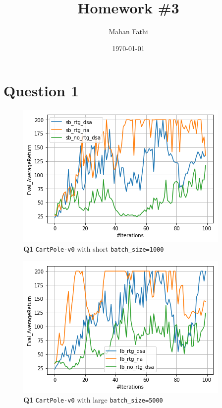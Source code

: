 \documentclass[11pt]{article}
\author{Mahan Fathi}
\date{\today}
\title{\textbf{Homework \#3}}
\begin{document}
\maketitle
\clearpage
\section{Question 1}
\label{sec:orga1d818e}
\begin{figure}[htbp]
\centering
\includegraphics[width=.9\linewidth]{./q11.png}
\caption{\textbf{Q1} \texttt{CartPole-v0} with short \texttt{batch\_size=1000}}
\end{figure}

\begin{figure}[htbp]
\centering
\includegraphics[width=.9\linewidth]{./q12.png}
\caption{\textbf{Q1} \texttt{CartPole-v0} with large \texttt{batch\_size=5000}}
\end{figure}
\end{document}
